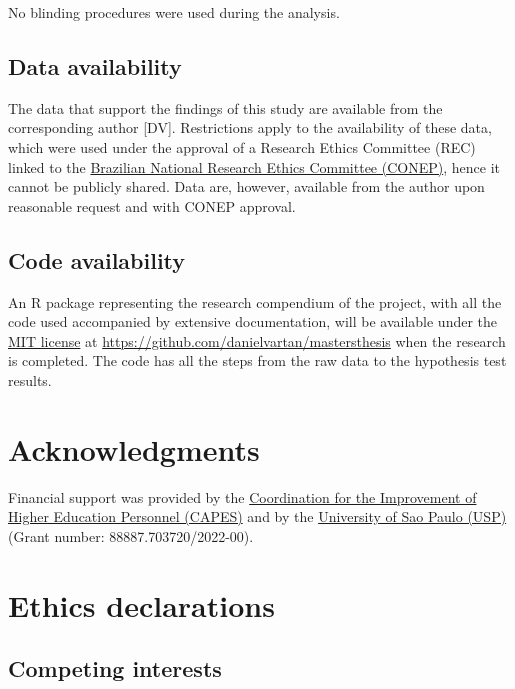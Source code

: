 \documentclass[
  12pt,
  a4paper,
  oneside]{tesesusp}
\begin{document}
No blinding procedures were used during the analysis.

\hypertarget{data-availability}{%
\subsection{Data availability}\label{data-availability}}

The data that support the findings of this study are available from the
corresponding author {[}DV{]}. Restrictions apply to the availability of
these data, which were used under the approval of a Research Ethics
Committee (REC) linked to the
\href{https://conselho.saude.gov.br/Web_comissoes/conep/index.html}{Brazilian
National Research Ethics Committee (CONEP)}, hence it cannot be publicly
shared. Data are, however, available from the author upon reasonable
request and with CONEP approval.

\hypertarget{code-availability}{%
\subsection{Code availability}\label{code-availability}}

An R package representing the research compendium of the project, with
all the code used accompanied by extensive documentation, will be
available under the \href{https://opensource.org/license/mit/}{MIT
license} at \url{https://github.com/danielvartan/mastersthesis} when the
research is completed. The code has all the steps from the raw data to
the hypothesis test results.

\hypertarget{acknowledgments-1}{%
\section{Acknowledgments}\label{acknowledgments-1}}

Financial support was provided by the
\href{https://www.gov.br/capes/}{Coordination for the Improvement of
Higher Education Personnel (CAPES)} and by the
\href{http://usp.br/}{University of Sao Paulo (USP)} (Grant number:
88887.703720/2022-00).

\hypertarget{ethics-declarations}{%
\section{Ethics declarations}\label{ethics-declarations}}

\hypertarget{competing-interests}{%
\subsection{Competing interests}\label{competing-interests}}
\end{document}
